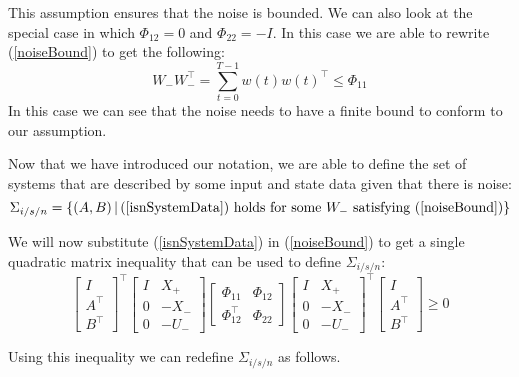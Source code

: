This assumption ensures that the noise is bounded.
We can also look at the special case in which $\Phi_{12} = 0$ and $\Phi_{22} = -I$. In this case we are able to rewrite (\ref{noiseBound}) to get the following:
\begin{equation} \label{noiseBoundSpecialCase}
	W_- W_-^\top = \sum^{T-1}_{t = 0}w(t)w(t)^\top \leq \Phi_{11}
\end{equation}
In this case we can see that the noise needs to have a finite bound to conform to our assumption. 

Now that we have introduced our notation, we are able to define the set of systems that are described by some input and state data given that there is noise:
\begin{equation} \label{isnSet}
	\Sigma_{i/s/n} = \left\{ (A,B) \, | \, \mbox{(\ref{isnSystemData}) holds for some }W_- \mbox{ satisfying (\ref{noiseBound})} \right\}
\end{equation}

We will now substitute (\ref{isnSystemData}) in (\ref{noiseBound}) to get a single quadratic matrix inequality that can be used to define $\Sigma_{i/s/n}$:
\begin{equation} \label{noiseSystemQMI}
	\begin{bmatrix} I \\ A^\top \\ B^\top \end{bmatrix}^\top
	\begin{bmatrix} I&X_+ \\ 0 & -X_- \\ 0&-U_- \end{bmatrix}
	\begin{bmatrix} \Phi_{11} & \Phi_{12} \\ \Phi_{12}^\top & \Phi_{22} \end{bmatrix}
	\begin{bmatrix} I&X_+ \\ 0 & -X_- \\ 0&-U_- \end{bmatrix}^\top
	\begin{bmatrix} I \\ A^\top \\ B^\top \end{bmatrix} \geq 0
\end{equation}

Using this inequality we can redefine $\Sigma_{i/s/n}$ as follows.


















